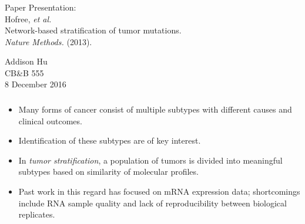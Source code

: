 
\usepackage{sty/personalmacros}
\usepackage{sty/personalslides}


\begin{frame}[fragile] \frametitle{}
\vfill
{
    \color{yaleblue}
    \fontsize{0.5cm}{0cm}\selectfont
    Paper Presentation: \\
}
\vspace{0.5cm}
Hofree, \textit{et al.}\\
\vspace{0.1cm}
{
    \fontsize{0.7cm}{0cm}\selectfont
    Network-based stratification of tumor mutations.\\
}
\vspace{0.1cm}
\textit{Nature Methods.} (2013).\\

\hfill

\vspace{2cm}
\begin{minipage}{1.0\textwidth}\raggedleft
    \color{yaleblue}
    Addison Hu   \\
    CB\&B 555\\
    8 December 2016
\end{minipage}
\end{frame}
%
\begin{frame}[fragile] \frametitle{}
    \begin{itemize}
        \item Many forms of cancer consist of multiple subtypes with different
            causes and clinical outcomes.
        \item Identification of these subtypes are of key interest.
        \item In \textit{tumor stratification},
            a population of tumors is divided into meaningful subtypes
            based on similarity of molecular profiles.
        \item Past work in this regard has focused on mRNA expression data;
            shortcomings include RNA sample quality and  lack of
            reproducibility between biological replicates.
    \end{itemize}
\end{frame}
